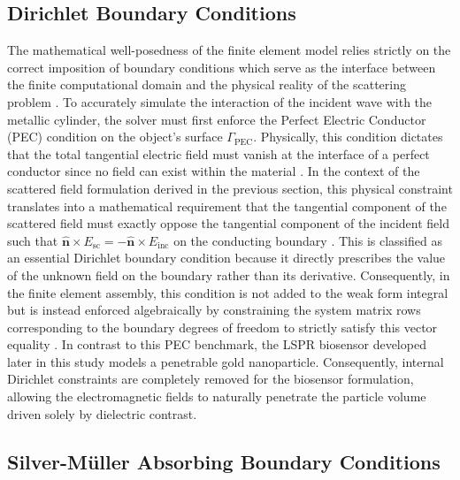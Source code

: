 \subsection{Dirichlet Boundary Conditions}

The mathematical well-posedness of the finite element model relies strictly on the correct imposition of boundary conditions which serve as the interface between the finite computational domain and the physical reality of the scattering problem \citep{Anees2019}. To accurately simulate the interaction of the incident wave with the metallic cylinder, the solver must first enforce the Perfect Electric Conductor (PEC) condition on the object's surface $\Gamma_{\text{PEC}}$. Physically, this condition dictates that the total tangential electric field must vanish at the interface of a perfect conductor since no field can exist within the material \citep{Sjoberg2025}. In the context of the scattered field formulation derived in the previous section, this physical constraint translates into a mathematical requirement that the tangential component of the scattered field must exactly oppose the tangential component of the incident field such that $\hat{\bm{n}} \times E_{\text{sc}} = -\hat{\bm{n}} \times E_{\text{inc}}$ on the conducting boundary \citep{Jin2015}. This is classified as an essential Dirichlet boundary condition because it directly prescribes the value of the unknown field on the boundary rather than its derivative. Consequently, in the finite element assembly, this condition is not added to the weak form integral but is instead enforced algebraically by constraining the system matrix rows corresponding to the boundary degrees of freedom to strictly satisfy this vector equality \citep{Otto2012}. In contrast to this PEC benchmark, the LSPR biosensor developed later in this study models a penetrable gold nanoparticle. Consequently, internal Dirichlet constraints are completely removed for the biosensor formulation, allowing the electromagnetic fields to naturally penetrate the particle volume driven solely by dielectric contrast.

\subsection{Silver-M\"{u}ller Absorbing Boundary Conditions}

